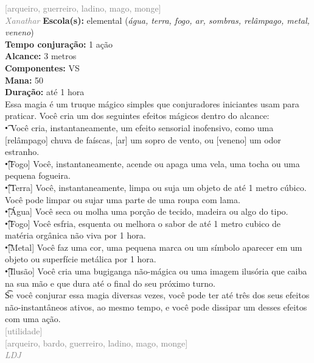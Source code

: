 \documentclass{RPG_Adventure}[2021/10/20]
\begin{document}
{\scriptsize \textcolor{gray}{[arqueiro, guerreiro, ladino, mago, monge]\\}}
{\tiny \textcolor{gray}{\textit{Xanathar}}}\jump{}
{\small \t \textbf{Escola(s):} elemental (\textit{água, terra, fogo, ar, sombras, relâmpago, metal, veneno})\\\t \textbf{Tempo conjuração:} 1 ação\\\t \textbf{Alcance:} 3 metros\\\t \textbf{Componentes:} VS\\\t \textbf{Mana:} 50\\\t \textbf{Duração:} até 1 hora\\}
{\normalsize Essa magia é um truque mágico simples que conjuradores iniciantes usam para praticar. Você cria um dos seguintes efeitos mágicos dentro do alcance:\\\t • Você cria, instantaneamente, um efeito sensorial inofensivo, como uma [relâmpago] chuva de faíscas, [ar] um sopro de vento, ou [veneno] um odor estranho.\\\t •[Fogo] Você, instantaneamente, acende ou apaga uma vela, uma tocha ou uma pequena fogueira.\\\t •[Terra] Você, instantaneamente, limpa ou suja um objeto de até 1 metro cúbico. Você pode limpar ou sujar uma parte de uma roupa com lama.\\\t •[Água] Você seca ou molha uma porção de tecido, madeira ou algo do tipo.\\\t •[Fogo] Você esfria, esquenta ou melhora o sabor de até 1 metro cubico de matéria orgânica não viva por 1 hora.\\\t •[Metal] Você faz uma cor, uma pequena marca ou um símbolo aparecer em um objeto ou superfície metálica por 1 hora.\\\t •[Ilusão] Você cria uma bugiganga não-mágica ou uma imagem ilusória que caiba na sua mão e que dura até o final do seu próximo turno.\\\t Se você conjurar essa magia diversas vezes, você pode ter até três dos seus efeitos não-instantâneos ativos, ao mesmo tempo, e você pode dissipar um desses efeitos com uma ação.\\}
{\scriptsize \textcolor{gray}{[utilidade]\\}}
{\scriptsize \textcolor{gray}{[arqueiro, bardo, guerreiro, ladino, mago, monge]\\}}
{\tiny \textcolor{gray}{\textit{LDJ}}}\jump{}
\end{document}
